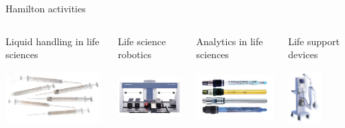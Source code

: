 \documentclass{beamer}
\begin{document}
\begin{frame}{Hamilton activities}

\begin{columns}

    \begin{block}{Liquid handling in life sciences}
      \begin{center}
	\includegraphics[height=2cm]{img/liquidhandling.jpg}
      \end{center}
    \end{block}

    \begin{block}{Life science robotics}
      \begin{center}
	\includegraphics[height=2cm]{img/robotics.jpg}
      \end{center}
    \end{block}

    \begin{block}{Analytics in life sciences}
      \begin{center}
	\includegraphics[height=2cm]{img/analytics.jpg}
      \end{center}
    \end{block}

    \begin{block}{Life support devices}
      \begin{center}
	\includegraphics[height=2cm]{img/medical.jpg}
      \end{center}
    \end{block}
\end{columns}

\end{frame}
\end{document}
